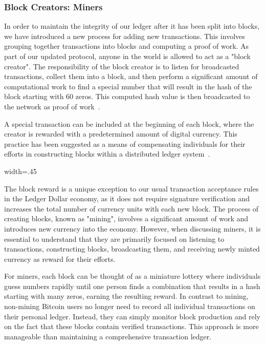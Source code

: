 \subsubsection{Block Creators: Miners}
In order to maintain the integrity of our ledger after it has been split into blocks, we have introduced a new process for adding new
transactions. This involves grouping together transactions into blocks and computing a proof of work. As part of our updated protocol,
anyone in the world is allowed to act as a "block creator". The responsibility of the block creator is to listen for broadcasted transactions,
collect them into a block, and then perform a significant amount of computational work to find a special number that will result in the
hash of the block starting with 60 zeros. This computed hash value is then broadcasted to the network as proof of work~\cite{wood2014ethereum}.

A special transaction can be included at the beginning of each block, where the creator is rewarded with a predetermined amount of digital
currency. This practice has been suggested as a means of compensating individuals for their efforts in constructing blocks within a
distributed ledger system~\cite{ding2020incentive}.

{width=.45\textwidth}%

The block reward is a unique exception to our usual transaction acceptance rules in the Ledger Dollar economy, as it does not require
signature verification and increases the total number of currency units with each new block. The process of creating blocks, known as
"mining", involves a significant amount of work and introduces new currency into the economy. However, when discussing miners, it is
essential to understand that they are primarily focused on listening to transactions, constructing blocks, broadcasting them, and
receiving newly minted currency as reward for their efforts.

For miners, each block can be thought of as a miniature lottery where individuals guess numbers rapidly until one person finds a combination
that results in a hash starting with many zeros, earning the resulting reward. In contrast to mining, non-mining Bitcoin users no longer
need to record all individual transactions on their personal ledger. Instead, they can simply monitor block production and rely on the
fact that these blocks contain verified transactions. This approach is more manageable than maintaining a comprehensive transaction ledger.

